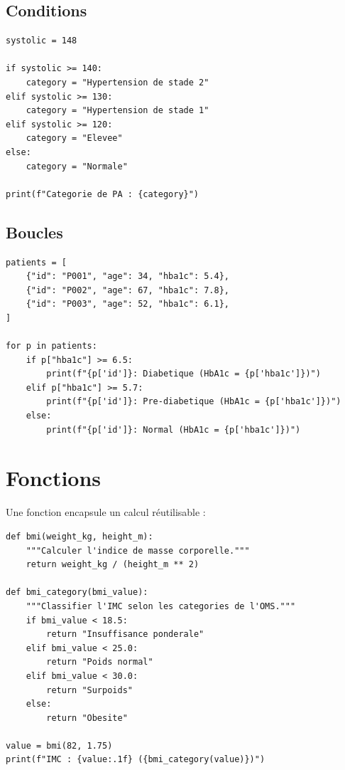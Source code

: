 \subsection{Conditions}

\begin{verbatim}
systolic = 148

if systolic >= 140:
    category = "Hypertension de stade 2"
elif systolic >= 130:
    category = "Hypertension de stade 1"
elif systolic >= 120:
    category = "Elevee"
else:
    category = "Normale"

print(f"Categorie de PA : {category}")
\end{verbatim}

\subsection{Boucles}

\begin{verbatim}
patients = [
    {"id": "P001", "age": 34, "hba1c": 5.4},
    {"id": "P002", "age": 67, "hba1c": 7.8},
    {"id": "P003", "age": 52, "hba1c": 6.1},
]

for p in patients:
    if p["hba1c"] >= 6.5:
        print(f"{p['id']}: Diabetique (HbA1c = {p['hba1c']})")
    elif p["hba1c"] >= 5.7:
        print(f"{p['id']}: Pre-diabetique (HbA1c = {p['hba1c']})")
    else:
        print(f"{p['id']}: Normal (HbA1c = {p['hba1c']})")
\end{verbatim}

\section{Fonctions}

Une fonction encapsule un calcul r\'eutilisable :

\begin{verbatim}
def bmi(weight_kg, height_m):
    """Calculer l'indice de masse corporelle."""
    return weight_kg / (height_m ** 2)

def bmi_category(bmi_value):
    """Classifier l'IMC selon les categories de l'OMS."""
    if bmi_value < 18.5:
        return "Insuffisance ponderale"
    elif bmi_value < 25.0:
        return "Poids normal"
    elif bmi_value < 30.0:
        return "Surpoids"
    else:
        return "Obesite"

value = bmi(82, 1.75)
print(f"IMC : {value:.1f} ({bmi_category(value)})")
\end{verbatim}

